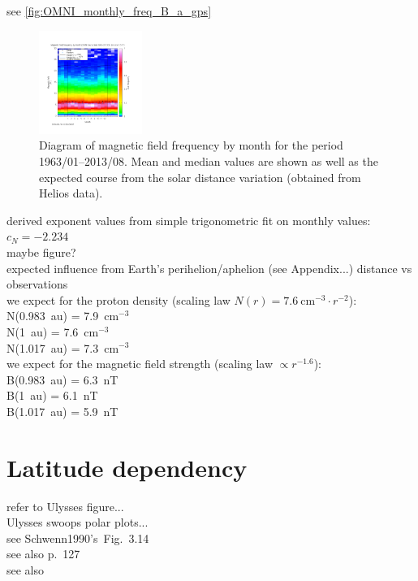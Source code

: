 see \autoref{fig:OMNI_monthly_freq_B_a_gps}
\begin{figure}[htb]
	\centering
	\includegraphics[width=0.3\textwidth]{images/gnuplots/OMNI_monthly_freq_B_a_gps.png}
	\caption{Diagram of magnetic field frequency by month for the period 1963/01--2013/08. Mean and median values are shown as well as the expected course from the solar distance variation (obtained from Helios data).}
	\label{fig:OMNI_monthly_freq_B_a_gps}
\end{figure}

derived exponent values from simple trigonometric fit on monthly values:\\
$c_N = -2.234$\\
maybe figure?\\

expected influence from Earth's perihelion/aphelion (see Appendix...) distance vs observations\\
we expect for the proton density (scaling law $N(r) = 7.6~\text{cm}^{-3} \cdot r^{-2}$):\\
N(0.983~au) = 7.9~cm$^{-3}$\\
N(1~au) = 7.6~cm$^{-3}$\\
N(1.017~au) = 7.3~cm$^{-3}$\\
we expect for the magnetic field strength (scaling law $\propto r^{-1.6}$):\\
B(0.983~au) = 6.3~nT\\
B(1~au) = 6.1~nT\\
B(1.017~au) = 5.9~nT\\


\section{Latitude dependency}
refer to Ulysses figure...\\
Ulysses swoops polar plots...\\
see Schwenn1990's~Fig.~3.14\\
see also \citet{Schwenn1990} p.~127\\
see also \citet{Richardson1995}\\

